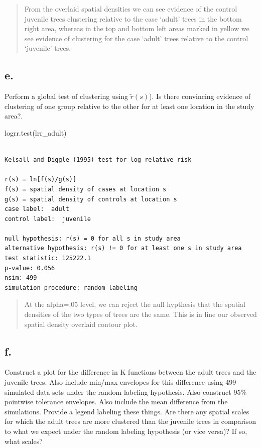 \documentclass[
  letterpaper,
  DIV=11,
  numbers=noendperiod]{scrartcl}
\newenvironment{Shaded}{\begin{snugshade}}{\end{snugshade}}
\newcommand{\FunctionTok}[1]{\textcolor[rgb]{0.28,0.35,0.67}{#1}}
\newcommand{\NormalTok}[1]{\textcolor[rgb]{0.00,0.23,0.31}{#1}}
\begin{document}
\begin{quote}
From the overlaid spatial densities we can see evidence of the control
juvenile trees clustering relative to the case `adult' trees in the
bottom right area, whereas in the top and bottom left areas marked in
yellow we see evidence of clustering for the case `adult' trees relative
to the control `juvenile' trees.
\end{quote}

\hypertarget{e.-1}{%
\subsection{e.}\label{e.-1}}

Perform a global test of clustering using \(\tilde{r}(s)\)). Is there
convincing evidence of clustering of one group relative to the other for
at least one location in the study area?.

\begin{Shaded}
\begin{Highlighting}[]
\FunctionTok{logrr.test}\NormalTok{(lrr\_adult)}
\end{Highlighting}
\end{Shaded}

\begin{verbatim}

Kelsall and Diggle (1995) test for log relative risk

r(s) = ln[f(s)/g(s)]
f(s) = spatial density of cases at location s
g(s) = spatial density of controls at location s
case label:  adult 
control label:  juvenile 

null hypothesis: r(s) = 0 for all s in study area
alternative hypothesis: r(s) != 0 for at least one s in study area
test statistic: 125222.1 
p-value: 0.056 
nsim: 499 
simulation procedure: random labeling
\end{verbatim}

\begin{quote}
At the alpha=.05 level, we can reject the null hypthesis that the
spatial densities of the two types of trees are the same. This is in
line our observed spatial density overlaid contour plot.
\end{quote}

\hypertarget{f.-1}{%
\subsection{f.}\label{f.-1}}

Construct a plot for the difference in K functions between the adult
trees and the juvenile trees. Also include min/max envelopes for this
difference using 499 simulated data sets under the random labeling
hypothesis. Also construct 95\% pointwise tolerance envelopes. Also
include the mean difference from the simulations. Provide a legend
labeling these things. Are there any spatial scales for which the adult
trees are more clustered than the juvenile trees in comparison to what
we expect under the random labeling hypothesis (or vice versa)? If so,
what scales?
\end{document}
